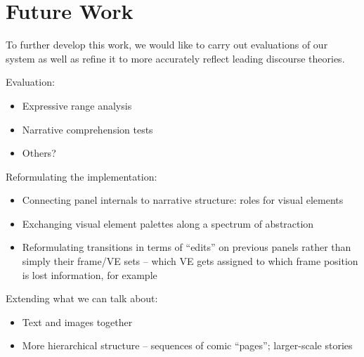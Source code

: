 \section{Future Work}

To further develop this work, we would like to carry out evaluations of our
system as well as refine it to more accurately reflect leading discourse
theories.

Evaluation:
\begin{itemize}
\item Expressive range analysis~\cite{smith2010analyzing}
\item Narrative comprehension tests
\item Others?
\end{itemize}

Reformulating the implementation:

\begin{itemize}
\item Connecting panel internals to narrative structure: roles for visual
elements
\item Exchanging visual element palettes along a spectrum of abstraction
\item Reformulating transitions in terms of ``edits'' on previous panels
rather than simply their frame/VE sets -- which VE gets assigned to which
frame position is lost information, for example
\end{itemize}

Extending what we can talk about:
\begin{itemize}
\item Text and images together
\item More hierarchical structure -- sequences of comic ``pages'';
larger-scale stories
\end{itemize}





